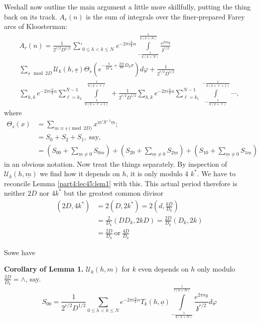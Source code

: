 We\pageoriginale shall now outline the main argument a little more
skillfully, putting the thing back on its track. $A_r (n)$ is the sum
of integrals over the finer-prepared Farey arcs of Kloosterman:
\begin{multline*}
  A_r (n) = \frac{1}{2^{r/2} D^{1/2}} \mathop{\textstyle{\sum'}}_{0
    \leq h < k \leq N} e^{- 2 \pi i \frac{h}{k} n}
  \int\limits^{\frac{1}{k(k+N)}}_{- \frac{1}{k(k+N)}} \frac{e^{2 \pi n
    \mathfrak{z}}}{\mathfrak{z}^{r/2}} \\
  \sum_{\underline{s} \mod 2D} \mathscr{U}_k (h, \underline{s})
  \Theta_s \left(e^{- \frac{\pi}{2k^2 \mathfrak{z}}+ \frac{2 \pi i}{4k} D_k
    \sigma}\right) d \varphi  + \frac{1}{2^{r/2} D^{1/2}}\\ 
  \sum_{h, k} e^{- 2 \pi i \frac{h}{k} n } \sum^{N-1}_{\ell =k_2}
  \int\limits^{\frac{1}{k(k+\ell)}}_{\frac{1}{k(k+ \ell+ 1)}} +
  \frac{1}{2^{r/2} D^{1/2}} \sum_{h, k} e^{- 2 \pi i \frac{h}{k} n}
    \sum^{N-1}_{\ell= k_1} \int\limits^{- \frac{1}{k(k+\ell+1)}}_{-
      \frac{1}{k(k+\ell)}}\cdots, 
\end{multline*}
where 
\begin{align*}
  \Theta_s (x) & = \sum_{\underline{m} \equiv \underline{s} \pmod{2D}}
  x^{\underline{m}' S^{-1} \underline{m}};\\
  & = S_0+ S_2 + S_1, ~\text{say},\\
  & = \left(S_{00} + \sum_{\underline{m}\neq 0} S_{0m}\right) +
  \left(S_{20} + \sum_{\underline{m}\neq 0} S_{2\underline{m}} \right)
  + \left(S_{10} + \sum_{\underline{m} \neq 0} S_{1\underline{m}} \right)
\end{align*}
in an obvious notation. Now treat the things separately. By inspection
of $\mathscr{U}_k (h, \underline{m})$ we find how it depends on $h$, it
is only modulo 4 $k^*$. We have to reconcile Lemma \ref{part4:lec45:lem1} with this. This
actual period therefore is neither $2D$ nor $4 k^*$ but the greatest
common divisor
\begin{align*}
  (2D, 4 k^*) & = 2(D, 2k^*) = 2 \left(d, \frac{kD}{D_k}\right)\\
  & = \frac{2}{D_k} (DD_k, 2 kD) = \frac{2D}{D_k} (D_k, 2k)\\
  & = \frac{2D}{D_k} ~\text{or}~ \frac{4D}{D_k}
\end{align*}

So\pageoriginale we have

\noindent \textbf{Corollary of Lemma 1.} $\mathscr{U}_k (h, m)$ for
$k$ even depends on $h$ only modulo $\frac{2D}{D_k}= \wedge$, say.
$$
S_{00} = \frac{1}{2^{r/2} D^{1/2}} \sum_{0 \leq h < k \leq N} e^{-2
  \pi i \frac{h}{k} n} T_k (h, \underline{o})
\int\limits^{\frac{1}{l(k+N)}}_{- \frac{1}{k(k+N)}} \frac{e^{2 \pi n
    \mathfrak{z}}}{\mathfrak{z}^{r/2}} d \varphi 
$$

